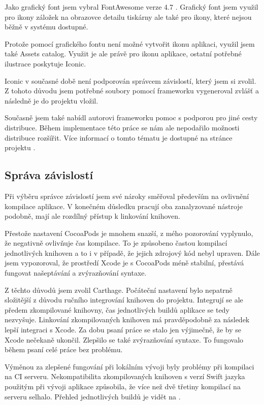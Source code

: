 Jako grafický font jsem vybral FontAwesome verze 4.7 \cite{fontawesome-web}.
Grafický font jsem využil pro ikony záložek na obrazovce detailu tiskárny ale také pro ikony, které nejsou běžně v systému dostupné.

Protože pomocí grafického fontu není možné vytvořit ikonu aplikaci, využil jsem také Assets catalog.
Využit je ale právě pro ikonu aplikace, ostatní potřebné ilustrace poskytuje Iconic.

Iconic v současné době není podporován správcem závislostí, který jsem si zvolil.
Z tohoto důvodu jsem potřebné soubory pomocí frameworku vygeneroval zvlášť a následně je do projektu vložil.

Současně jsem také nabídl autorovi frameworku pomoc s podporou pro jiné cesty distribuce.
Během implementace této práce se nám ale nepodařilo možnosti distribuce rozšířit.
Více informací o tomto tématu je dostupné na stránce projektu \cite{github-iconic-brew}.

\subsection{Správa závislostí}

Při výběru správce závislostí jsem své nároky směřoval především na ovlivnění kompilace aplikace.
V konečném důsledku pracují oba zanalyzované nástroje podobně, mají ale rozdílný přístup k linkování knihoven.

Přestože nastavení CocoaPods je mnohem snazší, z mého pozorování vyplynulo, že negativně ovlivňuje čas kompilace.
To je způsobeno častou kompilací jednotlivých knihoven a to i v případě, že jejich zdrojový kód nebyl upraven.
Dále jsem vypozoroval, že prostředí Xcode je s CocoaPods méně stabilní, přestává fungovat našeptávání a zvýrazňování syntaxe.

Z těchto důvodů jsem zvolil Carthage.
Počáteční nastavení bylo nepatrně složitější z důvodu ručního integrování knihoven do projektu.
Integrují se ale předem zkompilované knihovny, čas jednotlivých buildů aplikace se tedy nezvyšuje.
Linkování zkompilovaných knihoven má pravděpodobně za následek lepší integraci s Xcode.
Za dobu psaní práce se stalo jen výjimečně, že by se Xcode nečekaně ukončil.
Zlepšilo se také zvýrazňování syntaxe.
To fungovalo během psaní celé práce bez problému.

Výměnou za zlepšené fungování při lokálním vývoji byly problémy při kompilaci na CI serveru.
Nekompatibilita zkompilovaných knihoven s verzí Swift jazyka použitým při vývoji aplikace způsobila, že více než dvě třetiny kompilací na serveru selhalo.
Přehled jednotlivých buildů je vidět na \cite{travis-octophone-builds}.
